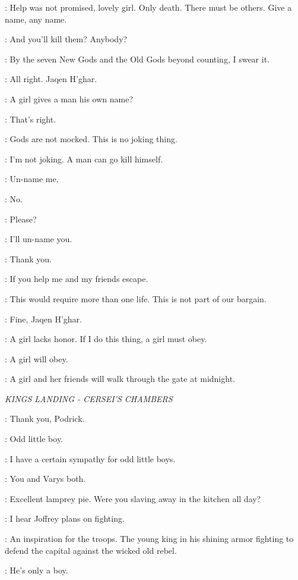 \JAQEN: Help was not promised, lovely girl. Only death. There must be others. Give a name, any name. 

\ARYA: And you'll kill them? Anybody? 

\JAQEN: By the seven New Gods and the Old Gods beyond counting, I swear it. 

\ARYA: All right. Jaqen H'ghar. 

\JAQEN: A girl gives a man his own name? 

\ARYA: That's right. 

\JAQEN: Gods are not mocked. This is no joking thing. 

\ARYA: I'm not joking. A man can go kill himself. 

\JAQEN: Un-name me. 

\ARYA: No. 

\JAQEN: Please? 

\ARYA: I'll un-name you. 

\JAQEN: Thank you. 

\ARYA: If you help me and my friends escape. 

\JAQEN: This would require more than one life. This is not part of our bargain. 

\ARYA: Fine, Jaqen H'ghar. 

\JAQEN: A girl lacks honor. If I do this thing, a girl must obey. 

\ARYA: A girl will obey. 

\JAQEN: A girl and her friends will walk through the gate at midnight. 

\scene

\textit{KINGS LANDING - CERSEI'S CHAMBERS} 


\TYRION: Thank you, Podrick. 

\CERSEI: Odd little boy. 

\TYRION: I have a certain sympathy for odd little boys. 

\CERSEI: You and Varys both. 

\TYRION: Excellent lamprey pie. Were you slaving away in the kitchen all day? 

\CERSEI: I hear Joffrey plans on fighting. 

\TYRION: An inspiration for the troops. The young king in his shining armor fighting to defend the capital against the wicked old rebel. 

\CERSEI: He's only a boy. 

